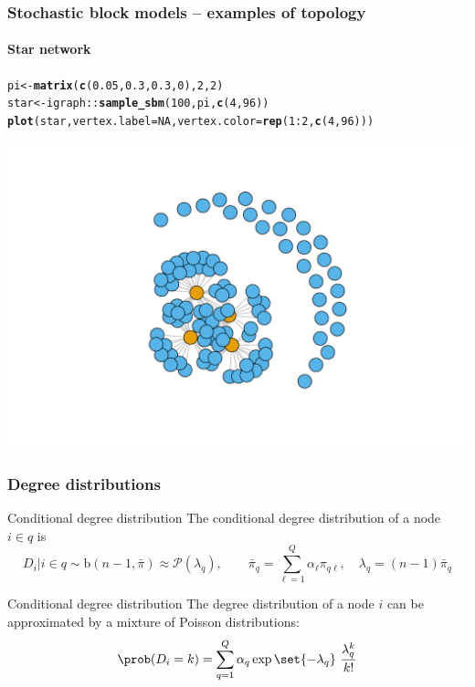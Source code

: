 \documentclass{beamer}\usepackage[]{graphicx}\usepackage[]{color}
\makeatletter
\newcommand{\hlnum}[1]{\textcolor[rgb]{0.686,0.059,0.569}{#1}}%
\newcommand{\hlopt}[1]{\textcolor[rgb]{0,0,0}{#1}}%
\newcommand{\hlstd}[1]{\textcolor[rgb]{0.345,0.345,0.345}{#1}}%
\newcommand{\hlkwb}[1]{\textcolor[rgb]{0.69,0.353,0.396}{#1}}%
\newcommand{\hlkwc}[1]{\textcolor[rgb]{0.333,0.667,0.333}{#1}}%
\newcommand{\hlkwd}[1]{\textcolor[rgb]{0.737,0.353,0.396}{\textbf{#1}}}%
\newenvironment{kframe}{%
 \def\at@end@of@kframe{}%
 \ifinner\ifhmode%
  \def\at@end@of@kframe{\end{minipage}}%
  \begin{minipage}{\columnwidth}%
 \fi\fi%
 \def\FrameCommand##1{\hskip\@totalleftmargin \hskip-\fboxsep
 \colorbox{shadecolor}{##1}\hskip-\fboxsep
     \hskip-\linewidth \hskip-\@totalleftmargin \hskip\columnwidth}%
 \MakeFramed {\advance\hsize-\width
   \@totalleftmargin\z@ \linewidth\hsize
   \@setminipage}}%
 {\par\unskip\endMakeFramed%
 \at@end@of@kframe}
\newenvironment{knitrout}{}{} %
\makeatother
\begin{document}
\begin{frame}[fragile]
  \frametitle{Stochastic block models -- examples of topology}
  \framesubtitle{Star network}

\begin{knitrout}\scriptsize
{}\color{fgcolor}\begin{kframe}
\begin{alltt}
\hlstd{pi} \hlkwb{<-} \hlkwd{matrix}\hlstd{(}\hlkwd{c}\hlstd{(}\hlnum{0.05}\hlstd{,}\hlnum{0.3}\hlstd{,}\hlnum{0.3}\hlstd{,}\hlnum{0}\hlstd{),}\hlnum{2}\hlstd{,}\hlnum{2}\hlstd{)}
\hlstd{star} \hlkwb{<-} \hlstd{igraph}\hlopt{::}\hlkwd{sample_sbm}\hlstd{(}\hlnum{100}\hlstd{, pi,} \hlkwd{c}\hlstd{(}\hlnum{4}\hlstd{,} \hlnum{96}\hlstd{))}
\hlkwd{plot}\hlstd{(star,} \hlkwc{vertex.label}\hlstd{=}\hlnum{NA}\hlstd{,} \hlkwc{vertex.color} \hlstd{=} \hlkwd{rep}\hlstd{(}\hlnum{1}\hlopt{:}\hlnum{2}\hlstd{,}\hlkwd{c}\hlstd{(}\hlnum{4}\hlstd{,}\hlnum{96}\hlstd{)))}
\end{alltt}
\end{kframe}
\includegraphics[width=.8\textwidth]{figures/unnamed-chunk-6-1} 

\end{knitrout}

\end{frame}

\begin{frame}
  \frametitle{Degree distributions}

  \begin{block}{Conditional degree distribution}
    The conditional degree distribution of a node $i\in q$ is
    \begin{equation*}
      D_i | i \in q \sim \mathrm{b}(n-1,\bar\pi) \approx \mathcal{P}(\lambda_q), \qquad \bar\pi_q = \sum_{\ell=1}^Q \alpha_\ell \pi_{q\ell}, \quad \lambda_q = (n-1)\bar\pi_q
    \end{equation*}
  \end{block}

  \vfill

  \begin{block}{Conditional degree distribution}
    The degree distribution of a node $i$ can be approximated by a mixture of Poisson distributions:
    \begin{equation*}
      \prob(D_i = k) = \sum_{q=1}^Q\alpha_q \exp{\set{-\lambda_q}} \ \frac{\lambda_q^k}{k !}
    \end{equation*}
  \end{block}

\end{frame}
\end{document}
